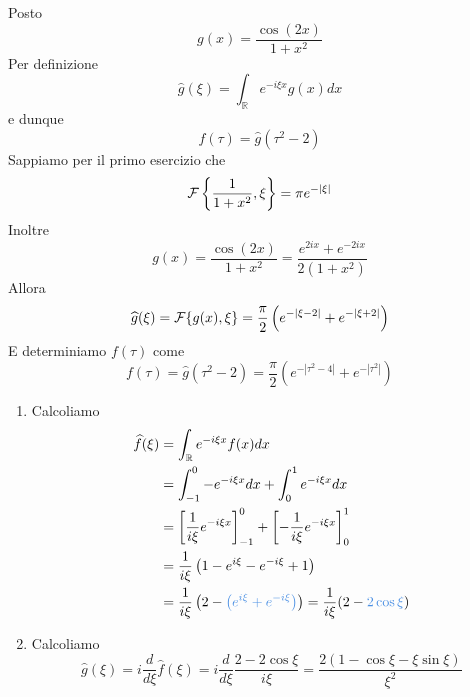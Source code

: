 Posto
\begin{equation*}
g( x) =\frac{\cos( 2x)}{1+x^{2}}
\end{equation*}
Per definizione
\begin{equation*}
\hat{g}( \xi ) =\int _{\mathbb{R}} e^{-i\xi x} g( x) dx
\end{equation*}
e dunque
\begin{equation*}
f( \tau ) =\hat{g}\left( \tau ^{2} -2\right)
\end{equation*}
Sappiamo per il primo esercizio che
\begin{equation*}
\mathcal{F} \left\{\frac{1}{1+x^{2}} ,\xi \right\} =\pi e^{-| \xi | }
\end{equation*}
Inoltre
\begin{equation*}
g( x) =\frac{\cos( 2x)}{1+x^{2}} =\frac{e^{2ix} +e^{-2ix}}{2\left( 1+x^{2}\right)}
\end{equation*}
Allora
\begin{equation*}
\widehat{g}( \xi ) =\mathcal{F} \{g( x) ,\xi \} =\frac{\pi }{2}\left( e^{-| \xi -2| } +e^{-| \xi +2| }\right)
\end{equation*}
E determiniamo $f( \tau )$ come
\begin{equation*}
f( \tau ) =\hat{g}\left( \tau ^{2} -2\right) =\frac{\pi }{2}\left( e^{-\left| \tau ^{2} -4\right| } +e^{-\left| \tau ^{2}\right| }\right)
\end{equation*}
\Soluzione
\begin{enumerate}
\item Calcoliamo\begin{equation*}
\begin{aligned}
\hat{f}( \xi ) & =\int _{\mathbb{R}} e^{-i\xi x} f( x) dx\\
 & =\int ^{0}_{-1} -e^{-i\xi x} dx+\int ^{1}_{0} e^{-i\xi x} dx\\
 & =\left[\frac{1}{i\xi } e^{-i\xi x}\right]^{0}_{-1} +\left[ -\frac{1}{i\xi } e^{-i\xi x}\right]^{1}_{0}\\
 & =\frac{1}{i\xi }\left( 1-e^{i\xi } -e^{-i\xi } +1\right)\\
 & =\frac{1}{i\xi }\left( 2-\textcolor[rgb]{0.29,0.56,0.89}{\left(e^{i\xi }+e^{-i\xi }\right)}\right) =\frac{1}{i\xi }( 2-\textcolor[rgb]{0.29,0.56,0.89}{2\cos\xi })
\end{aligned}
\end{equation*}
\item Calcoliamo\begin{equation*}
\hat{g}( \xi ) =i\frac{d}{d\xi }\hat{f}( \xi ) =i\frac{d}{d\xi }\frac{2-2\cos \xi }{i\xi } =\frac{2( 1-\cos \xi -\xi \sin \xi )}{\xi ^{2}}
\end{equation*}
\end{enumerate}
\Soluzione


